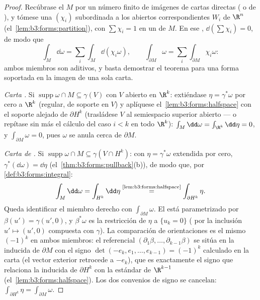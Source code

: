 \begin{proof}
Recúbrase el  $M$ por un
número finito de imágenes de cartas directas
( o de
), y tómese una
 $(\chi_i)$
subordinada a los abiertos
correspondientes $W_i$ de $\R^n$ (el~\cref{lem:b3:forms:partition}), con
$\sum\chi_i
= 1$ en un  de $M$. En ese
, $\dd(\sum\chi_i) = 0$, de
modo que
\[
\int_M\dd\omega = \sum_i\int_M\dd(\chi_i\omega),
\qquad
\int_{\partial M}\omega =
\sum_i\int_{\partial M}\chi_i\omega :
\]
ambos miembros son aditivos, y basta demostrar el teorema para una forma
soportada en la imagen de una sola carta.

\emph{Carta .} Si
$\operatorname{supp}\omega \cap M
\subseteq \gamma(V)$ con $V$ abierto en $\R^k$: extiéndase $\eta =
\gamma^*\omega$ por cero a $\R^k$ (regular, de soporte
 en $V$) y aplíquese
el~\cref{lem:b3:forms:halfspace} con el soporte alejado de
$\partial H^k$ (trasládese $V$ al semiespacio superior abierto --- o
repítase sin más el cálculo del caso $i < k$ en todo $\R^k$):
$\int_M\dd\omega =
\int_{\R^k}\dd\eta = 0$, y $\int_{\partial M}\omega = 0$, pues $\omega$
se anula cerca de $\partial M$.

\emph{Carta de .} Si
$\operatorname{supp}\omega\cap M
\subseteq \gamma(V \cap H^k)$: con $\eta = \gamma^*\omega$ extendida por
cero,
$\gamma^*(\dd\omega) = \dd\eta$
(el~\cref{thm:b3:forms:pullback}(b)), de modo que, por
\cref{def:b3:forms:integral}:
\[
\int_M\dd\omega = \int_{H^k}\dd\eta
\overset{\text{\cref{lem:b3:forms:halfspace}}}{=}
\int_{\partial H^k}\eta .
\]
Queda identificar el miembro derecho con $\int_{\partial
M}\omega$. El  está parametrizado
por $\beta(u') =
\gamma(u', 0)$, y $\beta^*\omega$ es la restricción de $\eta$ a
$\{u_k = 0\}$ ( por la
inclusión $u'
\mapsto (u', 0)$ compuesta con $\gamma$). La comparación de
orientaciones es el mismo $(-1)^k$ en
ambos miembros: el referencial
$(\partial_1\beta, \dots, \partial_{k-1}\beta)$ se sitúa en la
 inducida de $\partial M$
con el signo $\det(-e_k, e_1, \dots, e_{k-1}) = (-1)^k$ calculado en la
carta (el vector exterior retrocede a $-e_k$), que es exactamente el
signo que relaciona la 
inducida de $\partial H^k$ con la estándar de $\R^{k-1}$
(el~\cref{lem:b3:forms:halfspace}). Los dos convenios de signo se
cancelan:
$\int_{\partial H^k}\eta = \int_{\partial M}\omega$.
\end{proof}

